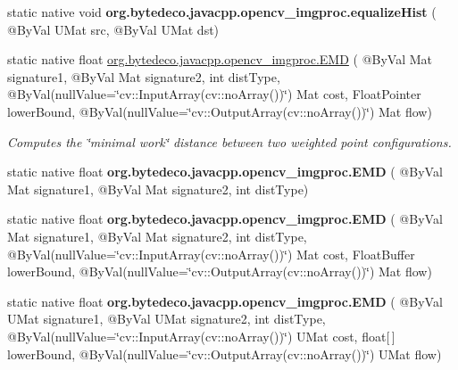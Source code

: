 \begin{DoxyCompactItemize}
\mbox{\label{group__imgproc__hist_ga33308dee90a59116a78ea9c778cf76a2}} 
static native void {\bfseries org.\+bytedeco.\+javacpp.\+opencv\+\_\+imgproc.\+equalize\+Hist} ( @By\+Val U\+Mat src, @By\+Val U\+Mat dst)
\item 
static native float \hyperlink{group__imgproc__hist_ga754ea5294cd28cb142b11116e1c4d658}{org.\+bytedeco.\+javacpp.\+opencv\+\_\+imgproc.\+E\+MD} ( @By\+Val Mat signature1, @By\+Val Mat signature2, int dist\+Type, @By\+Val(null\+Value=\char`\"{}cv\+::\+Input\+Array(cv\+::no\+Array())\char`\"{}) Mat cost, Float\+Pointer lower\+Bound, @By\+Val(null\+Value=\char`\"{}cv\+::\+Output\+Array(cv\+::no\+Array())\char`\"{}) Mat flow)
\begin{DoxyCompactList}\small\item\em Computes the \char`\"{}minimal work\char`\"{} distance between two weighted point configurations. \end{DoxyCompactList}\item 
\mbox{\label{group__imgproc__hist_ga52794b83ef22b22d4c109e0c7b21696e}} 
static native float {\bfseries org.\+bytedeco.\+javacpp.\+opencv\+\_\+imgproc.\+E\+MD} ( @By\+Val Mat signature1, @By\+Val Mat signature2, int dist\+Type)
\item 
\mbox{\label{group__imgproc__hist_ga45bd7b991f2c35d8ad5a6fef5154a66b}} 
static native float {\bfseries org.\+bytedeco.\+javacpp.\+opencv\+\_\+imgproc.\+E\+MD} ( @By\+Val Mat signature1, @By\+Val Mat signature2, int dist\+Type, @By\+Val(null\+Value=\char`\"{}cv\+::\+Input\+Array(cv\+::no\+Array())\char`\"{}) Mat cost, Float\+Buffer lower\+Bound, @By\+Val(null\+Value=\char`\"{}cv\+::\+Output\+Array(cv\+::no\+Array())\char`\"{}) Mat flow)
\item 
\mbox{\label{group__imgproc__hist_gaf4910259b923af1e2be2a597e74fffab}} 
static native float {\bfseries org.\+bytedeco.\+javacpp.\+opencv\+\_\+imgproc.\+E\+MD} ( @By\+Val U\+Mat signature1, @By\+Val U\+Mat signature2, int dist\+Type, @By\+Val(null\+Value=\char`\"{}cv\+::\+Input\+Array(cv\+::no\+Array())\char`\"{}) U\+Mat cost, float\mbox{[}$\,$\mbox{]} lower\+Bound, @By\+Val(null\+Value=\char`\"{}cv\+::\+Output\+Array(cv\+::no\+Array())\char`\"{}) U\+Mat flow)
\item 
\mbox{\label{group__imgproc__hist_ga0961fc0ee38183bd21ac336a90602949}} 

\end{DoxyCompactItemize}

